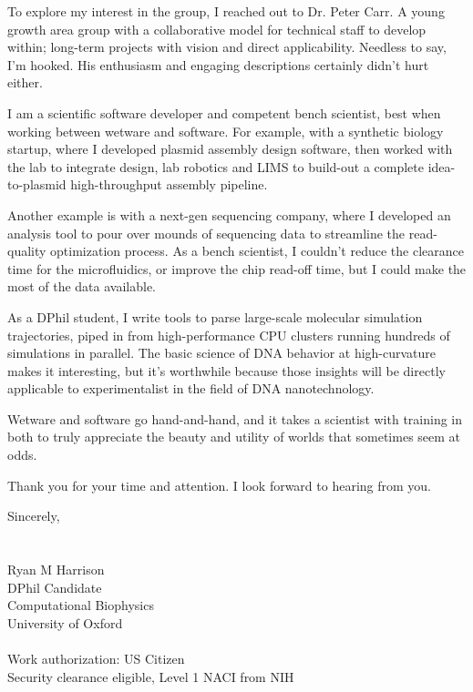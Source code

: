 \documentclass{../res}
\begin{document}
\begin{sloppypar}
\begin{resume}
To explore my interest in the group, I reached out to Dr. Peter Carr. A young growth area group with a collaborative model for technical staff to develop within; long-term projects with vision and direct applicability. Needless to say, I'm hooked. His enthusiasm and engaging descriptions certainly didn't hurt either.

I am a scientific software developer and competent bench scientist, best when working between wetware and software. For example, with a synthetic biology startup, where I developed plasmid assembly design software, then worked with the lab to integrate design, lab robotics and LIMS to build-out a complete idea-to-plasmid high-throughput assembly pipeline.

Another example is with a next-gen sequencing company, where I developed an analysis tool to pour over mounds of sequencing data to streamline the read-quality optimization process. As a bench scientist, I couldn't reduce the clearance time for the microfluidics, or improve the chip read-off time, but I could make the most of the data available.

As a DPhil student, I write tools to parse large-scale molecular simulation trajectories, piped in from high-performance CPU clusters running hundreds of simulations in parallel. The basic science of DNA behavior at high-curvature makes it interesting, but it's worthwhile because those insights will be directly applicable to experimentalist in the field of DNA nanotechnology. 

Wetware and software go hand-and-hand, and it takes a scientist with training in both to truly appreciate the beauty and utility of worlds that sometimes seem at odds.

Thank you for your time and attention. I look forward to hearing from you.

Sincerely, \\ \\ \\
Ryan M Harrison \\ 
DPhil Candidate \\
Computational Biophysics \\
University of Oxford  \\ \\
Work authorization: US Citizen \\
Security clearance eligible, Level 1 NACI from NIH \\
\end{resume} 
\end{sloppypar}
\end{document}
